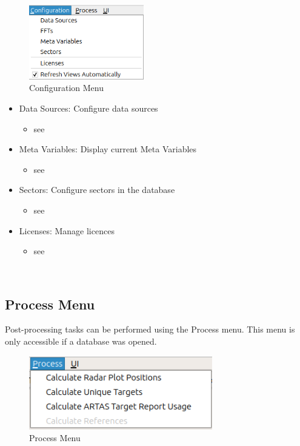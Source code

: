 \begin{figure}[H]
  \center
    \includegraphics[width=5cm,frame]{figures/ui_configuration_menu.png}
  \caption{Configuration Menu}
\end{figure}

\begin{itemize}
 \item Data Sources: Configure data sources
  \begin{itemize}
 \item see 
 \end{itemize}
 \item Meta Variables: Display current Meta Variables
  \begin{itemize}
 \item see 
 \end{itemize}
 \item Sectors: Configure sectors in the database
 \begin{itemize}
 \item see 
 \end{itemize}
  \item Licenses: Manage licences
 \begin{itemize}
 \item see 
 \end{itemize}
\end{itemize}
\  \\

\subsection{Process Menu}
\label{sec:ui_overview_process_menu}

Post-processing tasks can be performed using the Process menu. This menu is only accessible if a database was opened.

\begin{figure}[H]
  \center
    \includegraphics[width=8cm,frame]{figures/ui_process_menu.png}
  \caption{Process Menu}
\end{figure}

